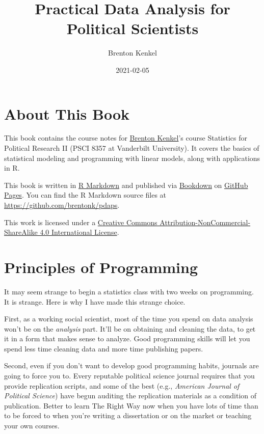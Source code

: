 \documentclass[
  12pt,
  oneside,openany]{book}
\title{Practical Data Analysis for Political Scientists}
\author{Brenton Kenkel}
\date{2021-02-05}
\begin{document}
\maketitle

{
\setcounter{tocdepth}{1}
\tableofcontents
}
\hypertarget{about-this-book}{%
\chapter{About This Book}\label{about-this-book}}

This book contains the course notes for \href{http://bkenkel.com}{Brenton Kenkel}'s course Statistics for Political Research II (PSCI 8357 at Vanderbilt University). It covers the basics of statistical modeling and programming with linear models, along with applications in R.

This book is written in \href{http://rmarkdown.rstudio.com}{R Markdown} and published via \href{https://bookdown.org}{Bookdown} on \href{https://pages.github.com}{GitHub Pages}. You can find the R Markdown source files at \url{https://github.com/brentonk/pdaps}.

This work is licensed under a \href{http://creativecommons.org/licenses/by-nc-sa/4.0/}{Creative Commons Attribution-NonCommercial-ShareAlike 4.0 International License}.

\hypertarget{programming}{%
\chapter{Principles of Programming}\label{programming}}

It may seem strange to begin a statistics class with two weeks on programming. It is strange. Here is why I have made this strange choice.

First, as a working social scientist, most of the time you spend on data analysis won't be on the \emph{analysis} part. It'll be on obtaining and cleaning the data, to get it in a form that makes sense to analyze. Good programming skills will let you spend less time cleaning data and more time publishing papers.

Second, even if you don't want to develop good programming habits, journals are going to force you to. Every reputable political science journal requires that you provide replication scripts, and some of the best (e.g., \emph{American Journal of Political Science}) have begun auditing the replication materials as a condition of publication. Better to learn The Right Way now when you have lots of time than to be forced to when you're writing a dissertation or on the market or teaching your own courses.
\end{document}

